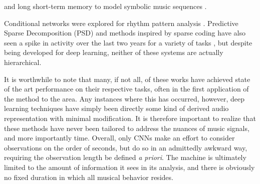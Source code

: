 and long short-term memory to model symbolic music sequences \cite{Eck2008}.

Conditional networks were explored for rhythm pattern analysis \cite{Battenberg2012}.
Predictive Sparse Decomposition (PSD) and methods inspired by sparse coding have also seen a spike in activity over the last two years for a variety of tasks \cite{Henaff2011, Nam2012}, but despite being developed for deep learning, neither of these systems are actually hierarchical.


It is worthwhile to note that many, if not all, of these works have achieved state of the art performance on their respective tasks, often in the first application of the method to the area.
Any instances where this has occurred, however, deep learning techniques have simply been directly some kind of derived audio representation with minimal modification.
It is therefore important to realize that these methods have never been tailored to address the nuances of music signals, and more importantly time.
Overall, only CNNs make an effort to consider observations on the order of seconds, but do so in an admittedly awkward way, requiring the observation length be defined \emph{a priori}.
The machine is ultimately limited to the amount of information it sees in its analysis, and there is obviously no fixed duration in which all musical behavior resides.



